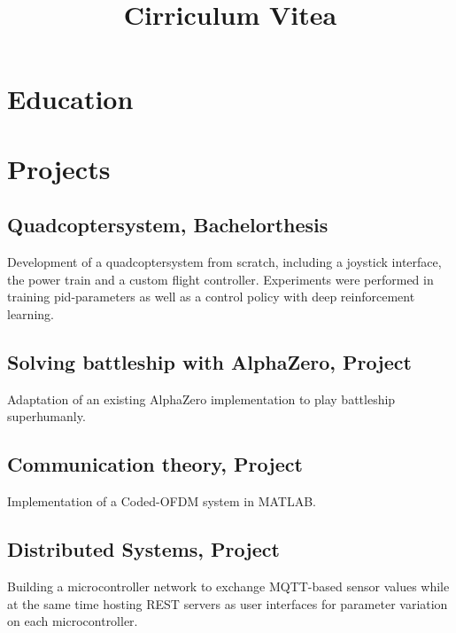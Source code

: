 \documentclass[10pt, a4paper, sans]{moderncv}
\title{Cirriculum Vitea}
\begin{document}

\makecvtitle

\vspace{-1cm}

\section{Education}

\section{Projects}
\subsection*{Quadcoptersystem, Bachelorthesis}
Development of a quadcoptersystem from scratch, including a joystick interface, the power train and a custom flight controller. Experiments were performed in training pid-parameters as well as a control policy with deep reinforcement learning.
\subsection*{Solving battleship with AlphaZero, Project}
Adaptation of an existing AlphaZero implementation to play battleship superhumanly.
\subsection{Communication theory, Project}
Implementation of a Coded-OFDM system in MATLAB.
\subsection{Distributed Systems, Project}
Building a microcontroller network to exchange MQTT-based sensor values while at the same time hosting REST servers as user interfaces for parameter variation on each microcontroller.
\end{document}

